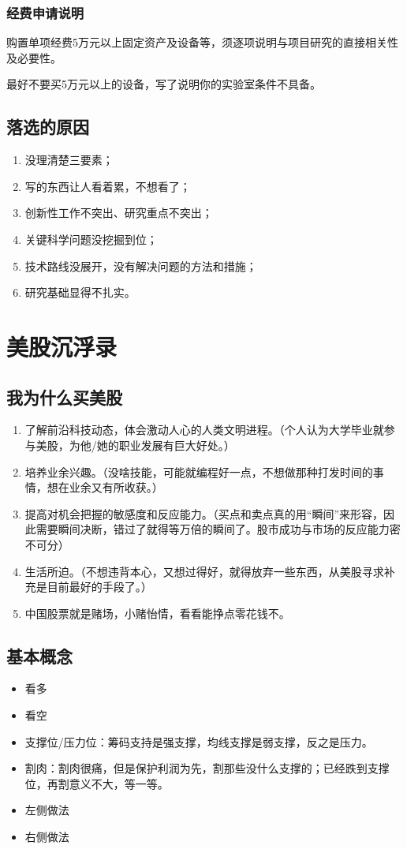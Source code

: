 \subsection{经费申请说明}
购置单项经费5万元以上固定资产及设备等，须逐项说明与项目研究的直接相关性及必要性。

最好不要买5万元以上的设备，写了说明你的实验室条件不具备。



\section{落选的原因}
\begin{enumerate}
\item 没理清楚三要素；
\item 写的东西让人看着累，不想看了；
\item 创新性工作不突出、研究重点不突出；
\item 关键科学问题没挖掘到位；
\item 技术路线没展开，没有解决问题的方法和措施；
\item 研究基础显得不扎实。
\end{enumerate}



\chapter{美股沉浮录}
\section{我为什么买美股}
\begin{enumerate}
\item 了解前沿科技动态，体会激动人心的人类文明进程。（个人认为大学毕业就参与美股，为他/她的职业发展有巨大好处。）

\item 培养业余兴趣。（没啥技能，可能就编程好一点，不想做那种打发时间的事情，想在业余又有所收获。）

\item 提高对机会把握的敏感度和反应能力。（买点和卖点真的用“瞬间”来形容，因此需要瞬间决断，错过了就得等万倍的瞬间了。股市成功与市场的反应能力密不可分）

\item 生活所迫。（不想违背本心，又想过得好，就得放弃一些东西，从美股寻求补充是目前最好的手段了。）

\item 中国股票就是赌场，小赌怡情，看看能挣点零花钱不。
\end{enumerate}



\section{基本概念}
\begin{itemize}
\item 看多
\item 看空
\item 支撑位/压力位：筹码支持是强支撑，均线支撑是弱支撑，反之是压力。
\item 割肉：割肉很痛，但是保护利润为先，割那些没什么支撑的；已经跌到支撑位，再割意义不大，等一等。
\item 左侧做法
\item 右侧做法
\end{itemize}









